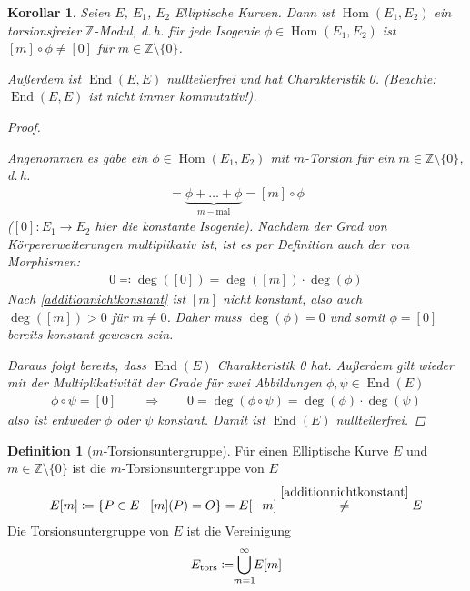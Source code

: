 \documentclass[english, german, parskip=half]{scrartcl}
\newtheorem{Korollar}[Satz]{Korollar}
\theoremstyle{definition}
\newtheorem{Definition}[Satz]{Definition}
\theoremstyle{remark}
\newcommand*{\Z}{\mathds{Z}}
\DeclareMathOperator{\Hom}{Hom} %
\DeclareMathOperator{\End}{End} %
\begin{document}
\begin{Korollar}
  Seien $E$, $E_1$, $E_2$ Elliptische Kurven. Dann ist $\Hom(E_1,E_2)$
  ein torsionsfreier $\Z$-Modul, d.\,h. für jede Isogenie
  $\phi\in\Hom(E_1,E_2)$ ist $[m]\circ\phi\neq[0]$ für
  $m\in\Z\setminus\{0\}$.

  Außerdem ist $\End(E,E)$ nullteilerfrei und hat Charakteristik 0.
  (Beachte: $\End(E,E)$ ist nicht immer kommutativ!).
  \begin{proof}
    \cite[siehe][Proposition 4.2 (b)]{silverman}
    
    Angenommen es gäbe ein $\phi\in\Hom(E_1,E_2)$ mit $m$-Torsion für
    ein $m\in\Z\setminus\{0\}$, d.\,h. 
    \begin{gather*}
      [0]
      =\underbrace{\phi+\dotsc+\phi}_{m-\text{mal}}
      = [m]\circ\phi
    \end{gather*}
    ($[0]\colon E_1\to E_2$ hier die konstante Isogenie).
    Nachdem der Grad von Körpererweiterungen multiplikativ ist, ist es
    per Definition auch der von Morphismen:
    \begin{gather*}
      0 \eqqcolon \deg([0]) = \deg([m])\cdot\deg(\phi)
    \end{gather*}
    Nach \autoref{additionnichtkonstant} ist $[m]$ nicht konstant,
    also auch $\deg([m])>0$ für $m\neq0$. Daher muss $\deg(\phi)=0$
    und somit $\phi=[0]$ bereits konstant gewesen sein.

    Daraus folgt bereits, dass $\End(E)$ Charakteristik 0 hat.
    Außerdem gilt wieder mit der Multiplikativität der Grade für zwei
    Abbildungen $\phi,\psi\in\End(E)$
    \begin{gather*}
      \phi\circ\psi=[0]
      \qquad\Longrightarrow\qquad
      0 = \deg(\phi\circ\psi) = \deg(\phi)\cdot\deg(\psi)
    \end{gather*}
    also ist entweder $\phi$ oder $\psi$ konstant.
    Damit ist $\End(E)$ nullteilerfrei.
  \end{proof}
\end{Korollar}

\begin{Definition}[$m$-Torsionsuntergruppe]
  Für einen Elliptische Kurve $E$ und $m\in\Z\setminus\{0\}$ ist die
  $m$-Torsionsuntergruppe von $E$
  \begin{gather*}
    E[m] \coloneqq \left\{ P\in E\;\middle|\; [m](P)=O\right\}
    = E[-m]
    \overset{\autoref{additionnichtkonstant}}{\neq}E
  \end{gather*}
  Die Torsionsuntergruppe von $E$ ist die Vereinigung
  \begin{gather*}
    E_\text{tors} \coloneqq \bigcup_{\mathclap{m=1}}^{\infty}E[m]
  \end{gather*}
\end{Definition}
\end{document}
